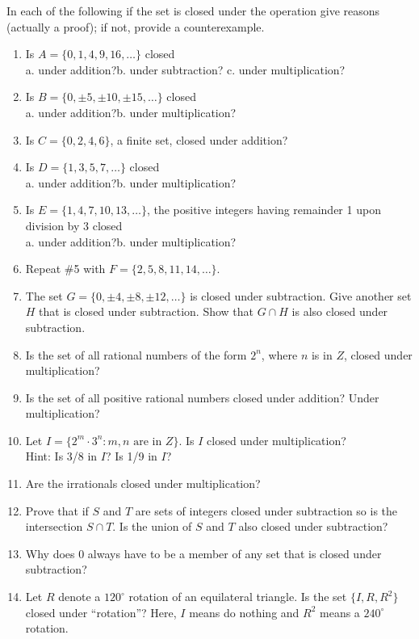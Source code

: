 \documentclass[12pt]{book}
\theoremstyle{definition}
\begin{document}
In each of the following if the set is closed under the operation give reasons (actually a proof); if not, provide a counterexample.\\[.1in]
\begin{enumerate}
\item Is $A=\{0,1,4,9,16,\dots\}$ closed\\
a. under addition?\qquad b. under subtraction? \qquad c. under multiplication?
\item Is $B=\{0,\pm5,\pm10,\pm15,\dots\}$ closed\\
a. under addition?\qquad b. under multiplication?
\item Is $C=\{0,2,4,6\}$, a finite set, closed under addition?
\item Is $D=\{1,3,5,7,\dots\}$ closed\\
a. under addition?\qquad b. under multiplication?
\item Is $E=\{1,4,7,10,13,\dots\}$, the positive integers having remainder 1 upon division by 3 closed\\
a. under addition?\qquad b. under multiplication?
\item Repeat \#5 with $F=\{2,5,8,11,14,\dots\}$.
\item The set $G=\{0,\pm4,\pm8,\pm12,\dots\}$ is closed under subtraction.  Give another set $H$ that is closed under subtraction.  Show that $G\cap H$ is also closed under subtraction.
\item Is the set of all rational numbers of the form $2^n$, where $n$ is in $Z$, closed under multiplication?
\item Is the set of all positive rational numbers closed under addition?  Under multiplication?
\item Let $I=\{2^m\cdot3^n:m,n \text{ are in } Z\}$.  Is $I$ closed under multiplication?\\
Hint:  Is 3/8 in $I$?  Is 1/9 in $I$?
\item Are the irrationals closed under multiplication?
\item Prove that if $S$ and $T$ are sets of integers closed under subtraction so is the intersection $S\cap T$.  Is the union of $S$ and $T$ also closed under subtraction?
\item Why does 0 always have to be a member of any set that is closed under subtraction?
\item Let $R$ denote a $120^\circ$ rotation of an equilateral triangle.  Is the set $\{I,R,R^2\}$ closed under ``rotation''?  Here, $I$ means do nothing and $R^2$ means a $240^\circ$ rotation.
\end{enumerate}
\end{document}
